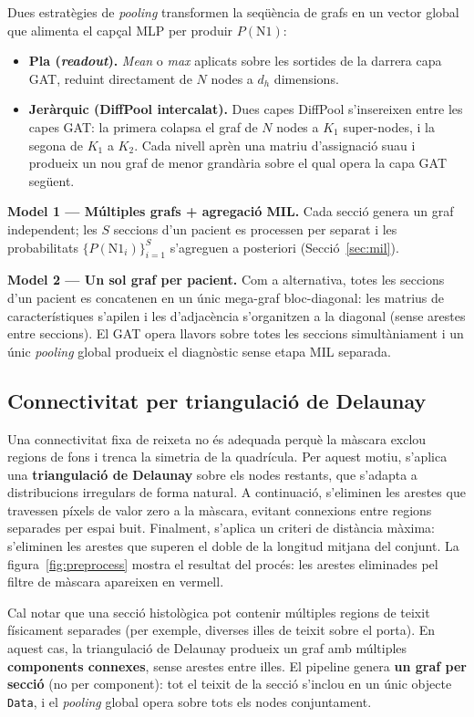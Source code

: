 \documentclass[10pt,a4paper,twocolumn,twoside]{article}
\begin{document}
Dues estratègies de \textit{pooling} transformen la seqüència de grafs en un vector global que
alimenta el capçal MLP per produir $P(\text{N1})$:
\begin{itemize}
  \item \textbf{Pla (\textit{readout}).} \textit{Mean} o \textit{max} aplicats sobre les sortides de
  la darrera capa GAT, reduint directament de $N$ nodes a $d_h$ dimensions.
  \item \textbf{Jeràrquic (DiffPool intercalat).} Dues capes DiffPool s'insereixen entre les capes
  GAT: la primera colapsa el graf de $N$ nodes a $K_1$ super-nodes, i la segona de $K_1$ a $K_2$.
  Cada nivell aprèn una matriu d'assignació suau i produeix un nou graf de menor grandària sobre el
  qual opera la capa GAT següent.
\end{itemize}

\textbf{Model 1 --- Múltiples grafs + agregació MIL.}
Cada secció genera un graf independent; les $S$ seccions d'un pacient es processen per separat i les
probabilitats $\{P(\text{N1}_i)\}_{i=1}^{S}$ s'agreguen a posteriori (Secció~\ref{sec:mil}).

\textbf{Model 2 --- Un sol graf per pacient.}
Com a alternativa, totes les seccions d'un pacient es concatenen en un únic mega-graf bloc-diagonal:
les matrius de característiques s'apilen i les d'adjacència s'organitzen a la diagonal (sense
arestes entre seccions). El GAT opera llavors sobre totes les seccions simultàniament i un únic
\textit{pooling} global produeix el diagnòstic sense etapa MIL separada. 
\subsection{Connectivitat per triangulació de Delaunay}

Una connectivitat fixa de reixeta no és adequada perquè la màscara exclou regions de fons i trenca la
simetria de la quadrícula. Per aquest motiu, s'aplica una \textbf{triangulació de Delaunay} sobre els
nodes restants, que s'adapta a distribucions irregulars de forma natural. A continuació, s'eliminen les
arestes que travessen píxels de valor zero a la màscara, evitant connexions entre regions separades per
espai buit. Finalment, s'aplica un criteri de distància màxima: s'eliminen les arestes que superen el
doble de la longitud mitjana del conjunt. La figura~\ref{fig:preprocess} mostra el resultat del procés: les arestes eliminades pel filtre de màscara apareixen en vermell.

Cal notar que una secció histològica pot contenir múltiples regions de teixit físicament separades
(per exemple, diverses illes de teixit sobre el porta). En aquest cas, la triangulació de Delaunay
produeix un graf amb múltiples \textbf{components connexes}, sense arestes entre illes. El pipeline
genera \textbf{un graf per secció} (no per component): tot el teixit de la secció s'inclou en un únic
objecte \texttt{Data}, i el \textit{pooling} global opera sobre tots els nodes conjuntament.
\end{document}
